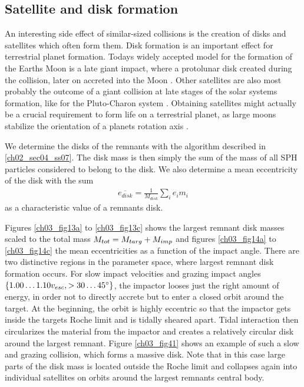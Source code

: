\subsection{Satellite and disk formation}
An interesting side effect of similar-sized collisions is the creation of disks and satellites which often form them. Disk formation is an important effect for terrestrial planet formation. Todays widely accepted model for the formation of the Earths Moon is a late giant impact, where a protolunar disk created during the collision, later on accreted into the Moon \citep{Benz:1985p1755, Canup:2000p3542}. Other satellites are also most probably the outcome of a giant collision at late stages of the solar systems formation, like for the Pluto-Charon system \citep{Canup:2005p1987}. Obtaining satellites might actually be a crucial requirement to form life on a terrestrial planet, as large moons stabilize the orientation of a planets rotation axis \citep{2000rewc.book.....W}.

We determine the disks of the remnants with the algorithm described in \ref{ch02_sec04_ss07}. The disk mass is then simply the sum of the mass of all SPH particles considered to belong to the disk. We also determine a mean eccentricity of the disk with the sum
\begin{align}
\overline{e_{disk}} = \frac{1}{M_{disk}} \sum_{i} e_i m_i 
\end{align}
as a characteristic value of a remnants disk.

Figures \ref{ch03_fig13a} to \ref{ch03_fig13c} shows the largest remnant disk masses scaled to the total mass $M_{tot} = M_{targ} + M_{imp}$ and figures \ref{ch03_fig14a} to \ref{ch03_fig14c} the mean eccentricities as a function of the impact angle. There are two distinctive regions in the parameter space, where largest remnant disk formation occurs. For slow impact velocities and grazing impact angles $\{ 1.00 \dots 1.10 v_{esc}, > 30 \dots 45 ^\circ \}$, the impactor looses just the right amount of energy, in order not to directly accrete but to enter a closed orbit around the target. At the beginning, the orbit is highly eccentric so that the impactor gets inside the targets Roche limit and is tidally sheared apart. Tidal interaction then circularizes the material from the impactor and creates a relatively circular disk around the largest remnant. Figure \ref{ch03_fig41} shows an example of such a slow and grazing collision, which forms a massive disk. Note that in this case large parts of the disk mass is located outside the Roche limit and collapses again into individual satellites on orbits around the largest remnants central body.

